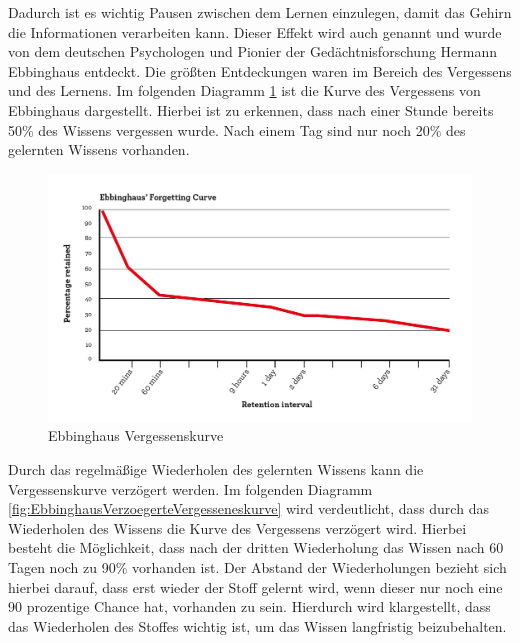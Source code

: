 \noindent
Dadurch ist es wichtig Pausen zwischen dem Lernen einzulegen, damit das Gehirn die Informationen verarbeiten kann. Dieser Effekt wird auch  genannt und wurde von dem deutschen Psychologen und Pionier der Gedächtnisforschung Hermann Ebbinghaus entdeckt. \cite{spacing_effect} Die größten Entdeckungen waren im Bereich des Vergessens und des Lernens. Im folgenden Diagramm \ref*{fig:EbbinghausVergesseneskurve} ist die Kurve des Vergessens von Ebbinghaus dargestellt. Hierbei ist zu erkennen, dass nach einer Stunde bereits 50\% des Wissens vergessen wurde. Nach einem Tag sind nur noch 20\% des gelernten Wissens vorhanden.
\begin{figure}[H]
  \centering
  \includegraphics[width=1\textwidth]{images/diagramme/Forgetting_Curve.png}
  \caption{Ebbinghaus Vergessenskurve}
  \label{fig:EbbinghausVergesseneskurve}
\end{figure}

\newpage
\noindent
Durch das regelmäßige Wiederholen des gelernten Wissens kann die Vergessenskurve verzögert werden. Im folgenden Diagramm \ref*{fig:EbbinghausVerzoegerteVergesseneskurve} wird verdeutlicht, dass durch das Wiederholen des Wissens die Kurve des Vergessens verzögert wird. Hierbei besteht die Möglichkeit, dass nach der dritten Wiederholung das Wissen nach 60 Tagen noch zu 90\% vorhanden ist. \cite*{spacing_effect} Der Abstand der Wiederholungen bezieht sich hierbei darauf, dass erst wieder der Stoff gelernt wird, wenn dieser nur noch eine 90 prozentige Chance hat, vorhanden zu sein. Hierdurch wird klargestellt, dass das Wiederholen des Stoffes wichtig ist, um das Wissen langfristig beizubehalten. \newline

